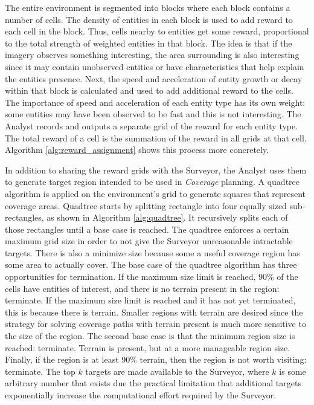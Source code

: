 \documentclass{tamuccthesis}
\begin{document}
The entire environment is segmented into blocks where each block contains a number of cells. The density of entities in each block is used to add reward to each cell in the block. Thus, cells nearby to entities get some reward, proportional to the total strength of weighted entities in that block. The idea is that if the imagery observes something interesting, the area surrounding is also interesting since it may contain unobserved entities or have characteristics that help explain the entities presence. Next, the speed and acceleration of entity growth or decay within that block is calculated and used to add additional reward to the cells. The importance of speed and acceleration of each entity type has its own weight: some entities may have been observed to be fast and this is not interesting. The Analyst records and outputs a separate grid of the reward for each entity type. The total reward of a cell is the summation of the reward in all grids at that cell. Algorithm \ref{alg:reward_assignment} shows this process more concretely. 

In addition to sharing the reward grids with the Surveyor, the Analyst uses them to generate target region intended to be used in \textit{Coverage} planning. A quadtree algorithm is applied on the environment's grid to generate squares that represent coverage areas. Quadtree starts by splitting rectangle into four equally sized sub-rectangles, as shown in Algorithm \ref{alg:quadtree}. It recursively splits each of those rectangles until a base case is reached. The quadtree enforces a certain maximum grid size in order to not give the Surveyor unreasonable intractable targets. There is also a minimize size because some a useful coverage region has some area to actually cover. The base case of the quadtree algorithm has three opportunities for termination. If the maximum size limit is reached, 90\% of the cells have entities of interest, and there is no terrain present in the region: terminate. If the maximum size limit is reached and it has not yet terminated, this is because there is terrain. Smaller regions with terrain are desired since the strategy for solving coverage paths with terrain present is much more sensitive to the size of the region. The second base case is that the minimum region size is reached: terminate. Terrain is present, but at a more manageable region size. Finally, if the region is at least 90\% terrain, then the region is not worth visiting: terminate. The top $k$ targets are made available to the Surveyor, where $k$ is some arbitrary number that exists due the practical limitation that additional targets exponentially increase the computational effort required by the Surveyor. 
\end{document}
